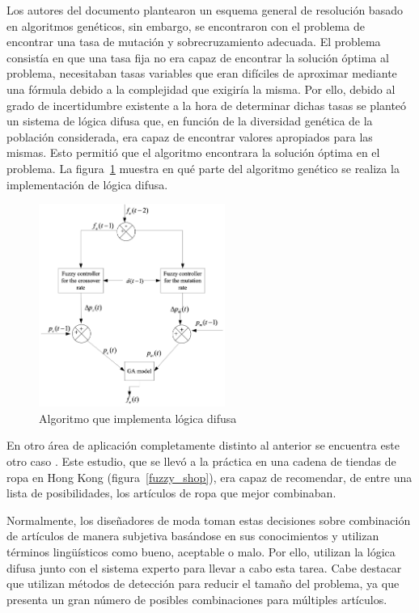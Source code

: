 \documentclass[12pt,a4paper, xcolor=table]{article}
\begin{document}
\vspace{3mm}

Los autores del documento plantearon un esquema general de resolución basado en algoritmos genéticos, sin embargo, se encontraron con el problema de encontrar una tasa de mutación y sobrecruzamiento adecuada. El problema consistía en que una tasa fija no era capaz de encontrar la solución óptima al problema, necesitaban tasas variables que eran difíciles de aproximar mediante una fórmula debido a la complejidad que exigiría la misma. Por ello, debido al grado de incertidumbre existente a la hora de determinar dichas tasas se planteó un sistema de lógica difusa que, en función de la diversidad genética de la población considerada, era capaz de encontrar valores apropiados para las mismas. Esto permitió que el algoritmo encontrara la solución óptima en el problema. La figura~\ref{genetic_fuzzy} muestra en qué parte del algoritmo genético se realiza la implementación de lógica difusa.

\begin{figure}[!h]
    \centering
    \includegraphics[width=230px]{img/genetic_fuzzy.png}
    \caption{Algoritmo que implementa lógica difusa\cite{fuzzytrain}}
    \label{genetic_fuzzy}
\end{figure}


\vspace{3mm}

En otro área de aplicación completamente distinto al anterior se encuentra este otro caso \cite{fuzzyfashion}. Este estudio, que se llevó a la práctica en una cadena de tiendas de ropa en Hong Kong (figura~\ref{fuzzy_shop}), era capaz de recomendar, de entre una lista de posibilidades, los artículos de ropa que mejor combinaban.

\vspace{1mm}

Normalmente, los diseñadores de moda toman estas decisiones sobre combinación de artículos de manera subjetiva basándose en sus conocimientos y utilizan términos lingüísticos como bueno, aceptable o malo. Por ello, utilizan la lógica difusa junto con el sistema experto para llevar a cabo esta tarea. Cabe destacar que utilizan métodos de detección para reducir el tamaño del problema, ya que presenta un gran número de posibles combinaciones para múltiples artículos.
\end{document}
